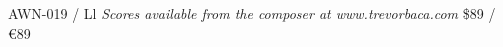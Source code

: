 \documentclass{article}
\begin{document}
\null \vfill

AWN-019 / Ll \hfill
\textit{Scores available from the composer at www.trevorbaca.com}
\hfill \$89 / \euro 89
\end{document}
